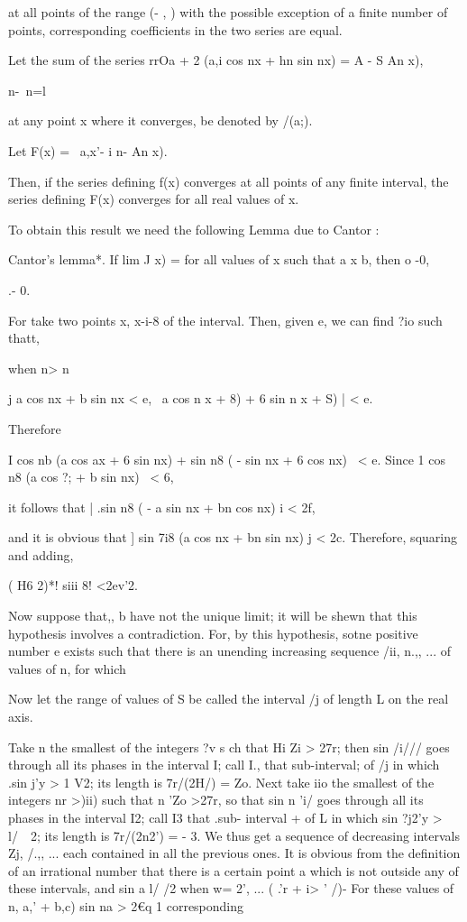 at all points of the range (- \pi, \pi) with the possible exception of a
finite number of points, corresponding coefficients in the two series
are equal.


Let the sum of the series rrOa + 2 (a,i cos nx + hn sin nx) = A - S An
x),

  n-\ n=l

at any point x where it converges, be denoted by /(a;).

Let F(x) = \ a,x'- i n- An x).

Then, if the series defining f(x) converges at all points of any
finite interval, the series defining F(x) converges for all real
values of x.

To obtain this result we need the following Lemma due to Cantor :

Cantor's lemma*. If lim J x) = for all values of x such that a x b,
then o -0,

 .- 0.

For take two points x, x-i-8 of the interval. Then, given e, we can
find ?io such thatt,

when n> n

j a cos nx + b sin nx < e, \ a cos n x + 8) + 6 sin n x + S) | < e.

Therefore

I cos nb (a cos ax + 6 sin nx) + sin n8 ( - sin nx + 6 cos nx) \ < e.
Since 1 cos n8 (a cos ?; + b sin nx) \ < 6,

it follows that | .sin n8 ( - a sin nx + bn cos nx) i < 2f,

and it is obvious that ] sin 7i8 (a cos nx + bn sin nx) j < 2c.
Therefore, squaring and adding,

( H6 2)*! siii 8! <2ev'2.

Now suppose that,, b have not the unique limit; it will be shewn
that this hypothesis involves a contradiction. For, by this
hypothesis, sotne positive number e exists such that there is an
unending increasing sequence /ii, n.,, ... of values of n, for which

Now let the range of values of S be called the interval /j of length L
on the real axis.

Take n the smallest of the integers ?v s ch that Hi Zi > 27r; then
sin /i/// goes through all its phases in the interval I; call I.,
that sub-interval; of /j in which .sin j'y > 1 V2; its length is
7r/(2H/) = Zo. Next take iio the smallest of the integers nr >)ii)
such that n 'Zo >27r, so that sin n 'i/ goes through all its phases in
the interval I2; call I3 that .sub- interval + of L in which sin ?j2'y
> l/\ \ 2; its length is 7r/(2n2') = - 3. We thus get a sequence of
decreasing intervals Zj, /.,, ... each contained in all the previous
ones. It is obvious from the definition of an irrational number that
there is a certain point a which is not outside any of these
intervals, and sin a l/ /2 when w= 2', ... ( .'r + i> ' /)- For these
values of n, a,' + b,c) sin na > 2€q 1%
corresponding

